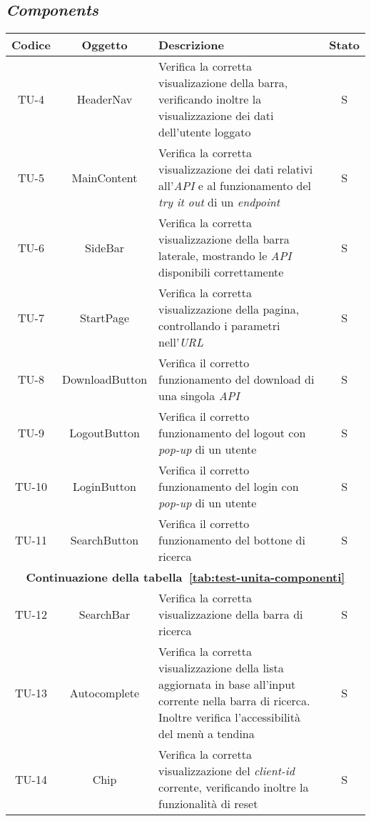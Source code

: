 \subsection*{\emph{Components}}

\begin{center}
  \label{tab:test-unita-componenti}
  \begin{longtable}{|c|c|p{}|c|}
  \hline
  \textbf{Codice} & \textbf{Oggetto} & \textbf{Descrizione} & \textbf{Stato}\\
  \hline
  TU-4 &HeaderNav &Verifica la corretta visualizazione della barra, verificando inoltre la visualizzazione dei dati dell'utente loggato  &S \\
  \hline
  TU-5 &MainContent &Verifica la corretta visualizzazione dei dati relativi all'\textit{API} e al funzionamento del \textit{try it out} di un \textit{endpoint} &S \\
  \hline
  TU-6 &SideBar &Verifica la corretta visualizzazione della barra laterale, mostrando le \textit{API} disponibili correttamente &S \\
  \hline
  TU-7 &StartPage &Verifica la corretta visualizzazione della pagina, controllando i parametri nell'\textit{URL} &S \\
  \hline
  TU-8 &DownloadButton &Verifica il corretto funzionamento del download di una singola \textit{API} &S \\
  \hline
  TU-9 &LogoutButton &Verifica il corretto funzionamento del logout con \textit{pop-up} di un utente &S \\
  \hline
  TU-10 &LoginButton &Verifica il corretto funzionamento del login con \textit{pop-up} di un utente &S \\
  \hline
  TU-11 &SearchButton &Verifica il corretto funzionamento del bottone di ricerca &S \\
  \hline
  \multicolumn{4}{|c|}{\textbf{Continuazione della tabella~\ref{tab:test-unita-componenti}}} \\
  \hline
  TU-12 &SearchBar &Verifica la corretta visualizzazione della barra di ricerca &S \\
  \hline
  TU-13 &Autocomplete &Verifica la corretta visualizzazione della lista aggiornata in base all'input corrente nella barra di ricerca. Inoltre verifica l'accessibilità del menù a tendina  &S \\
  \hline
  TU-14 &Chip &Verifica la corretta visualizzazione del \textit{client-id} corrente, verificando inoltre la funzionalità di reset &S \\

\end{longtable}
\end{center}
